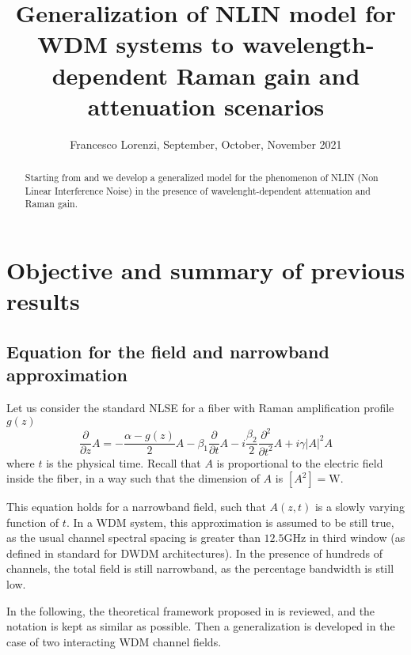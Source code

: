 \documentclass[10pt,journal]{IEEEtran}
\title{Generalization of NLIN model for WDM systems to wavelength-dependent Raman gain and attenuation scenarios}
\author{Francesco Lorenzi, September, October, November 2021}
\date{}
\begin{document}
\maketitle

\begin{abstract}
Starting from \cite{Dar_2013} and \cite{} we develop a generalized model for the phenomenon of NLIN (Non Linear Interference Noise) in the presence of wavelenght-dependent attenuation and Raman gain.
\end{abstract}

\section{Objective and summary of previous results}
\subsection{Equation for the field and narrowband approximation}
    Let us consider the standard NLSE for a fiber with Raman amplification profile $g(z)$
    \begin{equation}\label{eq:nlse}
        \frac{\partial}{\partial z} A = -\frac{\alpha - g(z)}{2}A - \beta_1 \frac{\partial}{\partial t} A - i \frac{\beta_2}{2} \frac{\partial^2}{\partial t^2} A + i \gamma |A|^2 A
    \end{equation}
    where $t$ is the physical time. Recall that $A$ is proportional to the electric field inside the fiber, in a way such that the dimension of $A$ is $[A^2] = \text{W}$.

    This equation holds for a narrowband field, such that $A(z, t)$ is a slowly varying function of $t$.
    In a WDM system, this approximation is assumed to be still true, as the usual channel spectral spacing is greater than $12.5$GHz  in third window (as defined in standard \cite{ITU-T} for DWDM architectures). In the presence of hundreds of channels, the total field is still narrowband, as the percentage bandwidth is still low.

    In the following, the theoretical framework proposed in \cite{Mecozzi_2012} is reviewed, and the notation is kept as similar as possible. Then a generalization is developed in the case of two interacting WDM channel fields.
\end{document}
